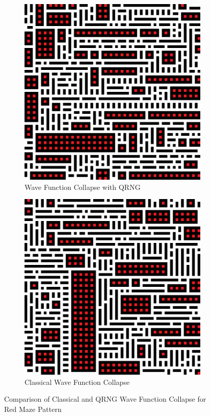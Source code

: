 \documentclass[10pt]{article}
\begin{document}
\begin{figure}[h]
\centering
\begin{subfigure}{.5\textwidth}
  \centering
  \includegraphics[scale=0.22]{redResultQRNG}
  \caption{Wave Function Collapse with QRNG}
  \label{fig:sub1}
\end{subfigure}%
\begin{subfigure}{.5\textwidth}
  \centering
  \includegraphics[scale=0.22]{redResultClassical}
  \caption{Classical Wave Function Collapse}
  \label{fig:sub2}
\end{subfigure}
\caption{Comparison of Classical and QRNG Wave Function Collapse for Red Maze Pattern}
\label{fig:test}
\end{figure}
\end{document}
